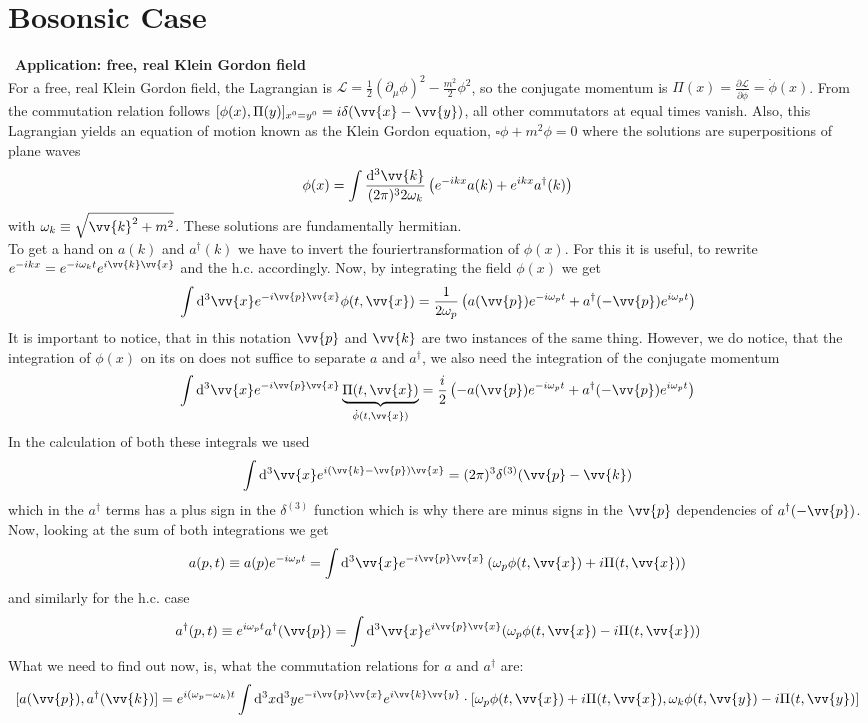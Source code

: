 \documentclass{include/thesisclass}
\newcommand{\LL}{\mathcal{L}}
\newcommand{\cc}{\cdot}
\newcommand{\vx}{\vv{x}}
\newcommand{\vy}{\vv{y}}
\newcommand{\vp}{\vv{p}}
\newcommand{\dd}{{\rm d}}
\newcommand{\p}{\partial}
\newcommand{\sub}[1]{~\newline\newline\textbf{#1}\\}
\begin{document}
\section{Bosonsic Case}
\sub{Application: free, real Klein Gordon field}
For a free, real Klein Gordon field, the Lagrangian is $\LL = \frac{1}{2}( \p_\mu \phi)^2 - \frac{m^2}{2} \phi^2$, so the conjugate momentum is $\Pi(x) = \frac{\p \LL}{\p \dot{\phi}} = \dot{\phi}(x)$. From the commutation relation follows $[\phi(x), \Pi(y)]_{x^0=y^0} = i \delta( \vx-\vy)$, all other commutators at equal times vanish. Also, this Lagrangian yields an equation of motion known as the Klein Gordon equation, $\square \phi + m^2 \phi = 0$ where the solutions are superpositions of plane waves
\[ \phi(x) = \int \frac{\dd ^3 \vv{k}}{(2\pi)^3 2 \omega_k} \left( e^{-ikx}a(k) + e^{ikx}a^\dagger(k)\right)\]
with $\omega_k \equiv \sqrt{ \vv{k}^2 + m^2}$. These solutions are fundamentally hermitian.\\
To get a hand on $a(k)$ and $a^\dagger(k)$ we have to invert the fouriertransformation of $\phi(x)$. For this it is useful, to rewrite $e^{-ikx} = e^{-i\omega_kt}e^{i \vv{k}\vx}$ and the h.c. accordingly. Now, by integrating the field $\phi(x)$ we get
\[ \int \dd^3 \vx e^{-i\vp\vx}\phi(t, \vx) = \frac{1}{2\omega_p}\left( a(\vp) e^{-i\omega_p t} + a^\dagger(-\vp)e^{i \omega_p t}\right)\]
It is important to notice, that in this notation $\vp$ and $\vv{k}$ are two instances of the same thing. However, we do notice, that the integration of $\phi(x)$ on its on does not suffice to separate $a$ and $a^\dagger$, we also need the integration of the conjugate momentum
\[ \int \dd^3 \vx e^{-i \vp \vx} \underbrace{\Pi(t, \vx)}_{\dot{\phi}(t,\vx)} = \frac{i}{2} \left( - a (\vp) e^{-i \omega_p t} + a^\dagger(- \vp) e^{i \omega_p t}\right)\]
In the calculation of both these integrals we used
\[ \int \dd ^3 \vx e^{i(\vv{k} - \vp)\vx} = (2\pi)^3 \delta^{(3)}(\vp - \vv{k})\]
which in the $a^\dagger$ terms has a plus sign in the $\delta^{(3)}$ function which is why there are minus signs in the $\vp$ dependencies of $a^\dagger(-\vp)$. Now, looking at the sum of both integrations we get
\[ a(p,t) \equiv a(p) e^{-i\omega_p t} = \int \dd^3 \vx e^{-i \vp \vx} \left( \omega_p \phi(t, \vx) + i \Pi(t, \vx)\right)\]
and similarly for the h.c. case
\[ a^\dagger(p,t) \equiv e^{i \omega_p t} a^\dagger(\vp) = \int \dd^3 \vx e^{i \vp \vx} ( \omega_p \phi(t, \vx) - i \Pi(t, \vx) )\]
What we need to find out now, is, what the commutation relations for $a$ and $a^\dagger$ are:
\[ [a(\vp), a^\dagger( \vv{k}) ] = e^{i(\omega_p - \omega _k) t} \int \dd^3 x \dd^3 y e^{-i \vp \vx} e^{ i \vv{k} \vy} \cc [ \omega_p \phi(t, \vx) + i \Pi(t, \vx), \omega_k\phi(t, \vy) - i \Pi(t, \vy)]\]
\end{document}
